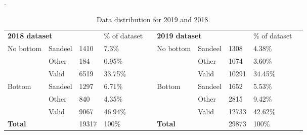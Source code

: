         \begin{table}[H]
        \caption[Data distribution]{Data distribution for 2019 and 2018.}.
        \begin{tabular}{|llll|l|l|lllll|l|l}
        \cline{1-5} \cline{7-12}
        \multicolumn{4}{|l|}{\textbf{2018 dataset}}                                             & \% of dataset &  & \multicolumn{5}{l|}{\textbf{2019 dataset}}                                             & \% of dataset &  \\ \cline{1-5} \cline{7-12}
        \multicolumn{2}{|l|}{\multirow{3}{*}{No bottom}} & \multicolumn{1}{l|}{Sandeel} & 1410  & 7.3\%         &  & \multicolumn{3}{l|}{\multirow{3}{*}{No bottom}} & \multicolumn{1}{l|}{Sandeel} & 1308  & 4.38\%        &  \\ \cline{3-5} \cline{10-12}
        \multicolumn{2}{|l|}{}                           & \multicolumn{1}{l|}{Other}   & 184   & 0.95\%        &  & \multicolumn{3}{l|}{}                           & \multicolumn{1}{l|}{Other}   & 1074  & 3.60\%         &  \\ \cline{3-5} \cline{10-12}
        \multicolumn{2}{|l|}{}                           & \multicolumn{1}{l|}{Valid}   & 6519  & 33.75\%       &  & \multicolumn{3}{l|}{}                           & \multicolumn{1}{l|}{Valid}   & 10291 & 34.45\%       &  \\ \cline{1-5} \cline{7-12}
        \multicolumn{2}{|l|}{\multirow{3}{*}{Bottom}}    & \multicolumn{1}{l|}{Sandeel} & 1297  & 6.71\%        &  & \multicolumn{3}{l|}{\multirow{3}{*}{Bottom}}    & \multicolumn{1}{l|}{Sandeel} & 1652  & 5.53\%        &  \\ \cline{3-5} \cline{10-12}
        \multicolumn{2}{|l|}{}                           & \multicolumn{1}{l|}{Other}   & 840   & 4.35\%        &  & \multicolumn{3}{l|}{}                           & \multicolumn{1}{l|}{Other}   & 2815  & 9.42\%        &  \\ \cline{3-5} \cline{10-12}
        \multicolumn{2}{|l|}{}                           & \multicolumn{1}{l|}{Valid}   & 9067  & 46.94\%       &  & \multicolumn{3}{l|}{}                           & \multicolumn{1}{l|}{Valid}   & 12733 & 42.62\%       &  \\ \cline{1-5} \cline{7-12}
        \multicolumn{3}{|l|}{\textbf{Total}}                                            & 19317 & 100\%         &  & \multicolumn{4}{l|}{\textbf{Total}}                                            & 29873 & 100\%         &  \\ \cline{1-5} \cline{7-12}
        \end{tabular}
        \label{data_distribution_table}
        \end{table}
        

